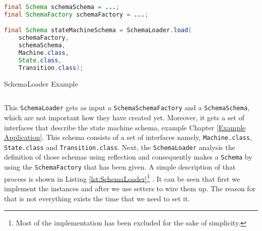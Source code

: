 \begin{sourcecode} [H]
	\begin{lstlisting}[language=Java, escapechar=|]
final Schema schemaSchema = ...;
final SchemaFactory schemaFactory = ...;

final Schema stateMachineSchema = SchemaLoader.load(
	schemaFactory, 
	schemaSchema, 
	Machine.class, 
	State.class, 
	Transition.class);
	\end{lstlisting}
	\caption{SchemaLoader Example}
	\label{lst:SchemaLoader Example}
\end{sourcecode}

This \texttt{SchemaLoader} gets as input a \texttt{SchemaSchemaFactory} and a \texttt{SchemaSchema}, which are not important how they have created yet.
Moreover, it gets a set of interfaces that describe the state machine schema, example Chapter \ref{Example Application}.
This schema consists of a set of interfaces namely, \texttt{Machine.class}, \texttt{State.class} and \texttt{Transition.class}.
Next, the \texttt{SchemaLoader} analysis the definition of those schemas using reflection and consequently makes a \texttt{Schema} by using the \texttt{SchemaFactory} that has been given.
A simple description of that process is shown in Listing \ref{lst:SchemaLoader}\footnote{
	Most of the implementation has been excluded for the sake of simplicity.}
. It can be seen that first we implement the instances and after we use setters to wire them up.
The reason for that is not everything exists the time that we need to set it.

